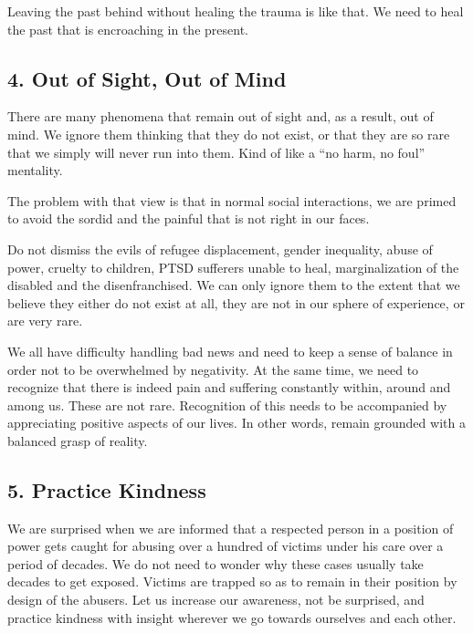 \documentclass[]{book}
\begin{document}
Leaving the past behind without healing the trauma is like that. We need to heal the past that is encroaching in the present.

\hypertarget{out-of-sight-out-of-mind}{%
\subsection*{4. Out of Sight, Out of Mind}\label{out-of-sight-out-of-mind}}

There are many phenomena that remain out of sight and, as a result, out of mind. We ignore them thinking that they do not exist, or that they are so rare that we simply will never run into them. Kind of like a ``no harm, no foul'' mentality.

The problem with that view is that in normal social interactions, we are primed to avoid the sordid and the painful that is not right in our faces.

Do not dismiss the evils of refugee displacement, gender inequality, abuse of power, cruelty to children, PTSD sufferers unable to heal, marginalization of the disabled and the disenfranchised. We can only ignore them to the extent that we believe they either do not exist at all, they are not in our sphere of experience, or are very rare.

We all have difficulty handling bad news and need to keep a sense of balance in order not to be overwhelmed by negativity. At the same time, we need to recognize that there is indeed pain and suffering constantly within, around and among us. These are not rare. Recognition of this needs to be accompanied by appreciating positive aspects of our lives. In other words, remain grounded with a balanced grasp of reality.

\hypertarget{practice-kindness}{%
\subsection*{5. Practice Kindness}\label{practice-kindness}}

We are surprised when we are informed that a respected person in a position of power gets caught for abusing over a hundred of victims under his care over a period of decades. We do not need to wonder why these cases usually take decades to get exposed. Victims are trapped so as to remain in their position by design of the abusers. Let us increase our awareness, not be surprised, and practice kindness with insight wherever we go towards ourselves and each other.
\end{document}
